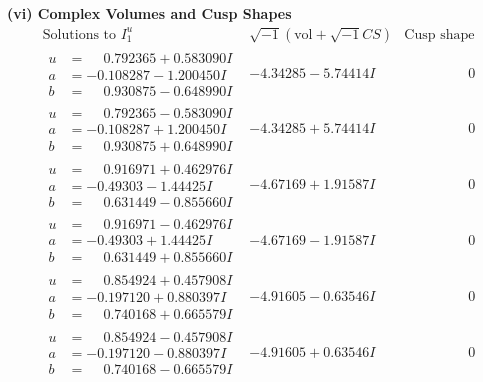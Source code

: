 \documentclass[1p]{elsarticle_modified}
\theoremstyle{definition}
\newcommand{\I}{\sqrt{-1}}
\begin{document}
\newpage\flushleft \textbf{(vi) Complex Volumes and Cusp Shapes}
$$\begin{array}{c|c|c}  
\text{Solutions to }I^u_{1}& \I (\text{vol} + \sqrt{-1}CS) & \text{Cusp shape}\\
 \hline 
\begin{aligned}
u &= \phantom{-}0.792365 + 0.583090 I \\
a &= -0.108287 - 1.200450 I \\
b &= \phantom{-}0.930875 - 0.648990 I\end{aligned}
 & -4.34285 - 5.74414 I & \phantom{-0.000000 } 0 \\ \hline\begin{aligned}
u &= \phantom{-}0.792365 - 0.583090 I \\
a &= -0.108287 + 1.200450 I \\
b &= \phantom{-}0.930875 + 0.648990 I\end{aligned}
 & -4.34285 + 5.74414 I & \phantom{-0.000000 } 0 \\ \hline\begin{aligned}
u &= \phantom{-}0.916971 + 0.462976 I \\
a &= -0.49303 - 1.44425 I \\
b &= \phantom{-}0.631449 - 0.855660 I\end{aligned}
 & -4.67169 + 1.91587 I & \phantom{-0.000000 } 0 \\ \hline\begin{aligned}
u &= \phantom{-}0.916971 - 0.462976 I \\
a &= -0.49303 + 1.44425 I \\
b &= \phantom{-}0.631449 + 0.855660 I\end{aligned}
 & -4.67169 - 1.91587 I & \phantom{-0.000000 } 0 \\ \hline\begin{aligned}
u &= \phantom{-}0.854924 + 0.457908 I \\
a &= -0.197120 + 0.880397 I \\
b &= \phantom{-}0.740168 + 0.665579 I\end{aligned}
 & -4.91605 - 0.63546 I & \phantom{-0.000000 } 0 \\ \hline\begin{aligned}
u &= \phantom{-}0.854924 - 0.457908 I \\
a &= -0.197120 - 0.880397 I \\
b &= \phantom{-}0.740168 - 0.665579 I\end{aligned}
 & -4.91605 + 0.63546 I & \phantom{-0.000000 } 0 \\ \hline\begin{aligned}

\end{aligned}
\end{array}$$
\end{document}
